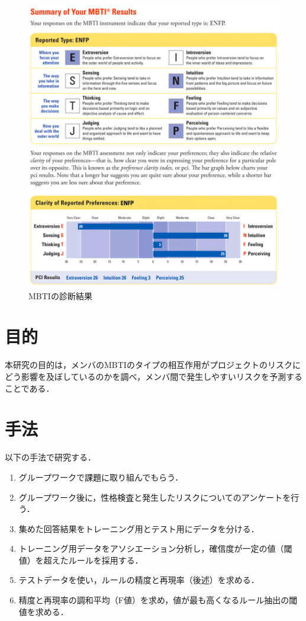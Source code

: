 \begin{figure}[thbp]
   \includegraphics[width=13cm]{mbti1.png}
   \caption{MBTIの診断結果}
   \label{M}
\end{figure}

\nocite{kaigai}

\chapter{目的}
本研究の目的は，メンバのMBTIのタイプの相互作用がプロジェクトのリスクにどう影響を及ぼしているのかを調べ，メンバ間で発生しやすいリスクを予測することである．


\chapter{手法}
以下の手法で研究する．
\begin{enumerate}
\item グループワークで課題に取り組んでもらう．
\item グループワーク後に，性格検査と発生したリスクについてのアンケートを行う．
\item 集めた回答結果をトレーニング用とテスト用にデータを分ける．
\item トレーニング用データをアソシエーション分析し，確信度が一定の値（閾値）を超えたルールを採用する．
\item テストデータを使い，ルールの精度と再現率（後述）を求める．
\item 精度と再現率の調和平均（F値）を求め，値が最も高くなるルール抽出の閾値を求める．
\end{enumerate}


